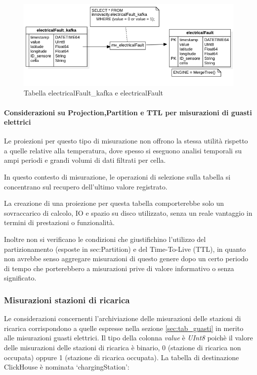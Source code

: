 \begin{figure}[H]
    \centering
    \includegraphics[width=1\textwidth]{../Images/SpecificaTecnica/electricalFault.png}
    \caption{Tabella electricalFault\_kafka e electricalFault}
    \label{fig:electricalFault_tables}
  \end{figure}


\paragraph{Considerazioni su Projection,Partition e TTL per misurazioni di guasti elettrici} 
Le proiezioni per questo tipo di misurazione non offrono la stessa utilità rispetto a quelle relative alla temperatura, dove spesso si eseguono analisi temporali su ampi periodi e grandi volumi di dati filtrati per cella.

In questo contesto di misurazione, le operazioni di selezione sulla tabella si concentrano sul recupero dell'ultimo valore registrato.

La creazione di una proiezione per questa tabella comporterebbe solo un sovraccarico di calcolo, IO e spazio su disco utilizzato, senza un reale vantaggio in termini di prestazioni o funzionalità.

Inoltre non si verificano le condizioni che giustifichino l'utilizzo del partizionamento (esposte in {sec:Partition}) e del Time-To-Live (TTL),  in quanto non avrebbe senso aggregare misurazioni di questo genere dopo un certo periodo di tempo che porterebbero a misurazioni prive di valore informativo o senza significato.

\subsubsection{Misurazioni stazioni di ricarica} Le considerazioni concernenti l'archiviazione delle misurazioni delle stazioni di ricarica corrispondono a quelle espresse nella sezione \ref{sec:tab_guasti} in merito alle misurazioni guasti elettrici. Il tipo della colonna \textit{value} è \textit{UInt8} poichè il valore delle misurazioni delle stazioni di ricarica è binario, 0 (stazione di ricarica non occupata) oppure 1 (stazione di ricarica occupata). La tabella di destinazione ClickHouse è nominata ‘chargingStation’:

